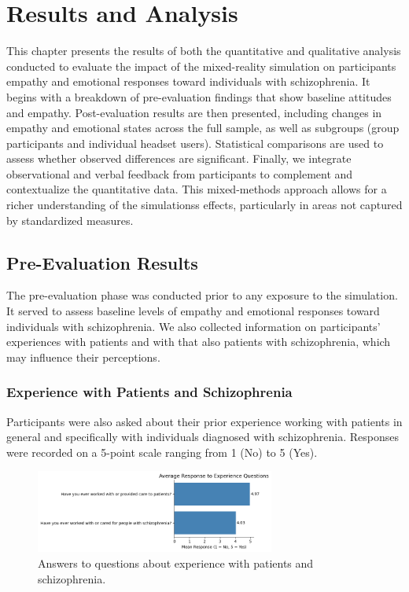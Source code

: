 \chapter{Results and Analysis}
\label{ch:resultsandanalysis}

This chapter presents the results of both the quantitative and qualitative analysis conducted to evaluate the impact of the mixed-reality simulation on participants empathy and emotional responses toward individuals with schizophrenia. It begins with a breakdown of pre-evaluation findings that show baseline attitudes and empathy. Post-evaluation results are then presented, including changes in empathy and emotional states across the full sample, as well as subgroups (group participants and individual headset users). Statistical comparisons are used to assess whether observed differences are significant. Finally, we integrate observational and verbal feedback from participants to complement and contextualize the quantitative data. This mixed-methods approach allows for a richer understanding of the simulationss effects, particularly in areas not captured by standardized measures.

\section{Pre-Evaluation Results}
The pre-evaluation phase was conducted prior to any exposure to the simulation. It served to assess baseline levels of empathy and emotional responses toward individuals with schizophrenia. We also collected information on participants' experiences with patients and with that also patients with schizophrenia, which may influence their perceptions.

\subsection{Experience with Patients and Schizophrenia}

Participants were also asked about their prior experience working with patients in general and specifically with individuals diagnosed with schizophrenia. Responses were recorded on a 5-point scale ranging from 1 (No) to 5 (Yes).


\begin{figure}[H]
    \centering
    \includegraphics[width=0.7\textwidth]{../../Figures/experience-patients.png}
    \caption{Answers to questions about experience with patients and schizophrenia.}
    \label{fig:experience_patients}
\end{figure}

